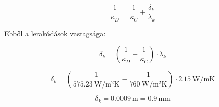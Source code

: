 \begin{equation}
	\frac{1}{\kappa_D}=\frac{1}{\kappa_C}+\frac{\delta_k}{\lambda_k}
\end{equation}

Ebből a lerakódások vastagsága:

\begin{equation}
	\delta_k=(\frac{1}{\kappa_D}-\frac{1}{\kappa_C})\cdot\lambda_k
\end{equation}

\begin{equation}
\delta_k=(\frac{1}{\SI {575.23}{\watt\per\meter\squared\kelvin}}-\frac{1}{\SI{760}{\watt\per\meter\squared\kelvin}})\cdot \SI{2.15}{\watt\per\meter\kelvin}
\end{equation}

\begin{equation}
	\delta_k = \SI {0.0009}{\meter} = \SI {0.9}{\milli\meter}
\end{equation}